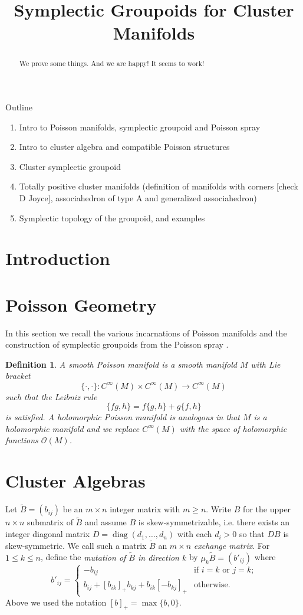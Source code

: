 \documentclass{amsart}
\title{Symplectic Groupoids for Cluster Manifolds}
\newtheorem{definition}[theorem]{Definition}
\newcommand{\diag}{\operatorname{diag}}
\renewcommand{\max}{\operatorname{max}}
\begin{document}
\begin{abstract}
  We prove some things.
  And we are happy!
  It seems to work!
\end{abstract}
\maketitle
Outline
\begin{enumerate}
	\item Intro to Poisson manifolds, symplectic groupoid and Poisson spray
	\item Intro to cluster algebra and compatible Poisson structures 
	\item Cluster symplectic groupoid
	\item Totally positive cluster manifolds (definition of manifolds with corners [check D Joyce], associahedron of type A and generalized associahedron)
	\item Symplectic topology of the groupoid, and examples
\end{enumerate}

\section{Introduction}


\section{Poisson Geometry}
In this section we recall the various incarnations of Poisson manifolds and the construction of symplectic groupoids from the Poisson spray \cite{MR2900786}.

\begin{definition}
A smooth Poisson manifold is a smooth manifold $M$ with Lie bracket
$$
	\{\cdot, \cdot\}: C^\infty(M) \times C^\infty(M) \to C^\infty(M)
$$
such that the Leibniz rule
$$
	\{fg, h\} = f\{g,h\} + g\{f,h\}
$$
is satisfied. A holomorphic Poisson manifold is analogous in that $M$ is a holomorphic manifold and we replace $C^\infty(M)$ with the space of holomorphic functions $\mathcal{O}(M)$.
\end{definition}


\section{Cluster Algebras}

Let $\tilde B=(b_{ij})$ be an $m\times n$ integer matrix with $m\ge n$.  
Write $B$ for the upper $n\times n$ submatrix of $\tilde B$ and assume $B$ is skew-symmetrizable, i.e. there exists an integer diagonal matrix $D=\diag(d_1,\ldots,d_n)$ with each $d_i>0$ so that $DB$ is skew-symmetric. 
We call such a matrix $\tilde B$ an $m\times n$ \emph{exchange matrix}.
For $1\le k\le n$, define the \emph{mutation of $\tilde B$ in direction $k$} by $\mu_k\tilde B=(b'_{ij})$ where
\[b'_{ij}=\begin{cases}-b_{ij} & \text{if $i=k$ or $j=k$;}\\ b_{ij}+[b_{ik}]_+b_{kj}+b_{ik}[-b_{kj}]_+ & \text{otherwise.}\end{cases}\]
Above we used the notation $[b]_+=\max\{b,0\}$.
\end{document}
